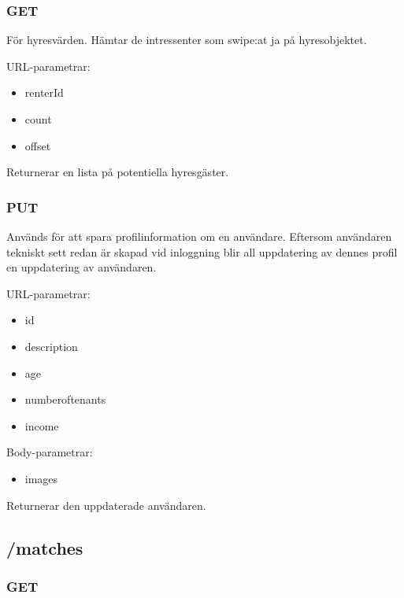 \documentclass{article}
\begin{document}
\subsubsection {GET}
\label{ssub:GET}

För hyresvärden. Hämtar de intressenter som swipe:at ja på hyresobjektet.

URL-parametrar:

\begin{itemize}
    \item renterId
    \item count
    \item offset
\end{itemize}

Returnerar en lista på potentiella hyresgäster.

\subsubsection {PUT}
\label{ssub:PUT}

Används för att spara profilinformation om en användare. Eftersom användaren tekniskt sett redan är skapad vid inloggning blir all uppdatering av
dennes profil en uppdatering av användaren.

URL-parametrar:

\begin{itemize}
    \item id
    \item description
    \item age
    \item numberoftenants
    \item income
\end{itemize}

Body-parametrar:

\begin{itemize}
    \item images
\end{itemize}

Returnerar den uppdaterade användaren.

\subsection {/matches}
\label{sub:/matches}

\subsubsection {GET}
\label{ssub:GET}
\end{document}
